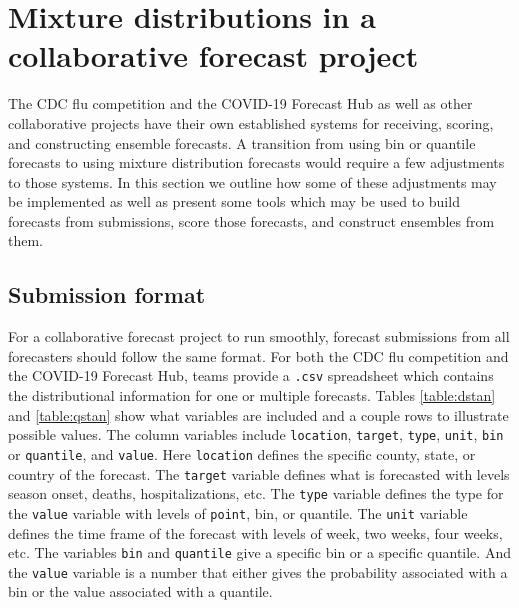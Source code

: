 \documentclass[11pt,notitlepage]{isuthesis}
\begin{document}
\chapter{Mixture distributions in a collaborative forecast project}
\label{section:conmixforc}


The CDC flu competition and the COVID-19 Forecast Hub as well as other 
collaborative projects
have their own established systems for receiving, 
scoring, and constructing ensemble forecasts. A transition from using bin or 
quantile forecasts to using mixture distribution forecasts
would require
a few adjustments to those systems. In this section we outline how some of these
adjustments may be implemented as well as present some tools which may be used
to build forecasts from submissions, score those forecasts, and construct 
ensembles from them.

\section{Submission format}
For a collaborative forecast project to run smoothly, forecast submissions from 
all forecasters 
should follow the same format. For both the CDC flu competition and
the COVID-19 Forecast Hub, teams provide a \texttt{.csv} spreadsheet which 
contains the distributional information for one or multiple forecasts. Tables
\ref{table:dstan} and \ref{table:qstan} show what variables are included and a
couple rows to illustrate possible values.
The column variables include \texttt{location}, \texttt{target}, \texttt{type},
\texttt{unit}, \texttt{bin} or \texttt{quantile}, and \texttt{value}.
Here \texttt{location} defines the specific county, state, or country of the 
forecast. The \texttt{target} variable defines what is forecasted with levels
season onset, deaths, hospitalizations, etc. The \texttt{type} variable defines
the type for the \texttt{value} variable with levels of \texttt{point}, 
bin, or quantile.
The \texttt{unit} variable defines the time frame of the forecast with levels of
week,
two weeks, four weeks, etc. The variables \texttt{bin} and \texttt{quantile}
give a specific bin or a specific quantile. And the \texttt{value} variable is a 
number that 
either gives the probability associated with a bin or the value associated 
with a quantile.
\end{document}
